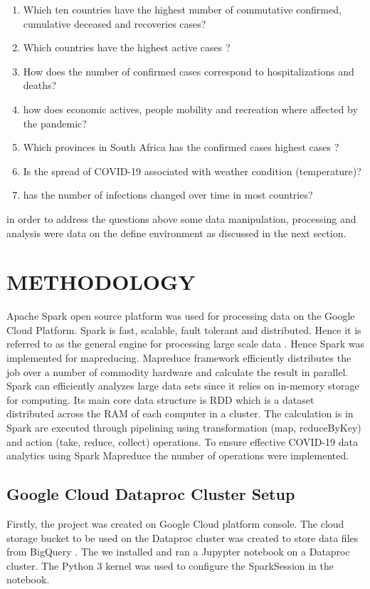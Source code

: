 \documentclass[12pt,letterpaper, twoside]{article}
\begin{document}
\begin{enumerate}
    \item Which  ten countries have the highest number of commutative confirmed, cumulative deceased and recoveries cases?
    \item  Which countries have the highest active cases ?
    \item How does the number of confirmed cases correspond to hospitalizations and deaths?
    \item how does economic actives, people mobility and recreation where affected by the pandemic?
    \item Which provinces in South Africa has the  confirmed cases highest cases ?
    \item Is the spread of COVID-19 associated with weather condition (temperature)?
    \item has the number of infections changed over time in most countries?
\end{enumerate}

in order to address the questions above  some  data manipulation, processing and analysis were data on the define environment as discussed in the next section.

\section{METHODOLOGY}
Apache Spark open source platform was used for processing data on the Google Cloud Platform. Spark is fast, scalable, fault tolerant and distributed. Hence it is referred to as the general engine for processing large scale data  \cite{Chouksey and Chauhan, 2017}. Hence Spark was implemented for mapreducing. Mapreduce framework efficiently distributes the job over a number of commodity hardware and calculate the result in parallel. Spark can efficiently analyzes large data sets since it relies on in-memory storage for computing. Its main core data structure is RDD which is a dataset distributed across the RAM  of each computer in a cluster. The calculation is in Spark are executed through pipelining using transformation (map, reduceByKey) and action (take, reduce, collect) operations. To ensure effective COVID-19 data analytics using Spark Mapreduce the number of operations were implemented.

\subsection{ Google Cloud Dataproc Cluster Setup}
Firstly, the project was created on Google Cloud platform console. The cloud storage bucket to be used on the Dataproc cluster was created to store data files from BigQuery . The we installed and ran a Jupypter notebook on a Dataproc cluster. The Python 3 kernel was used to configure the SparkSession in the notebook. 
\end{document}
